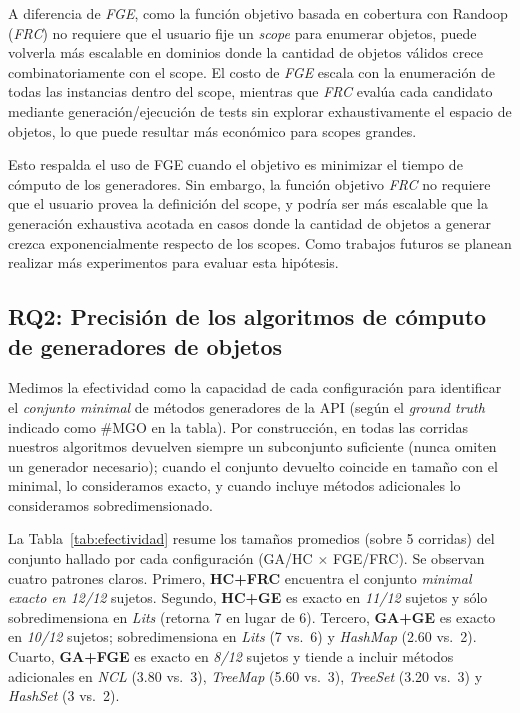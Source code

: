 A diferencia de \emph{FGE}, como la función objetivo basada en cobertura con Randoop
(\emph{FRC}) no requiere que el usuario fije un \emph{scope} para enumerar
objetos, puede volverla más escalable en dominios donde la cantidad de
objetos válidos crece combinatoriamente con el scope. 
El costo de \emph{FGE} escala con la enumeración de todas
las instancias dentro del scope, mientras que \emph{FRC} evalúa cada candidato
mediante generación/ejecución de tests sin explorar exhaustivamente el
espacio de objetos, lo que puede resultar más económico para scopes grandes.

Esto respalda el uso de FGE cuando el objetivo es minimizar el tiempo de cómputo de los generadores.
Sin embargo, la función objetivo \emph{FRC} no requiere que el usuario provea la definición del scope, y
podría ser más escalable que la generación exhaustiva acotada en casos donde
la cantidad de objetos a generar crezca exponencialmente respecto de los scopes. Como trabajos futuros se planean realizar más experimentos 
para evaluar esta hipótesis.



\subsection{RQ2: Precisión de los algoritmos de cómputo de generadores de objetos}
\label{sec:experimentalIdentificacionPrecision}

Medimos la efectividad como la capacidad de cada configuración para identificar
el \emph{conjunto minimal} de métodos generadores de la API (según el
\emph{ground truth} indicado como \#MGO en la tabla). Por construcción, en
todas las corridas nuestros algoritmos devuelven siempre un subconjunto
suficiente (nunca omiten un generador necesario); cuando el conjunto
devuelto coincide en tamaño con el minimal, lo consideramos exacto, y
cuando incluye métodos adicionales lo consideramos sobredimensionado.

La Tabla~\ref{tab:efectividad} resume los tamaños promedios (sobre 5
corridas) del conjunto hallado por cada configuración (GA/HC $\times$ FGE/FRC).
Se observan cuatro patrones claros. Primero, \textbf{HC+FRC} encuentra el conjunto
\emph{minimal exacto en 12/12} sujetos. Segundo, \textbf{HC+GE} es exacto en
\emph{11/12} sujetos y sólo sobredimensiona en \emph{Lits} (retorna 7 en lugar de
6).
Tercero, \textbf{GA+GE} es exacto en \emph{10/12} sujetos; sobredimensiona en
\emph{Lits} (7 vs.\ 6) y \emph{HashMap} (2.60 vs.\ 2). Cuarto, \textbf{GA+FGE} es
exacto en \emph{8/12} sujetos y tiende a incluir métodos adicionales en
\emph{NCL} (3.80 vs.\ 3), \emph{TreeMap} (5.60 vs.\ 3), \emph{TreeSet}
(3.20 vs.\ 3) y \emph{HashSet} (3 vs.\ 2).

